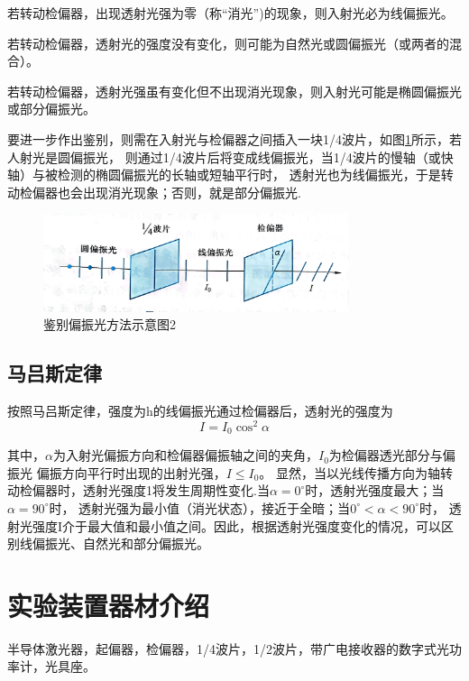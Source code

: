 \documentclass{ctexart}
\begin{document}
  若转动检偏器，出现透射光强为零（称“消光”)的现象，则入射光必为线偏振光。
  
  若转动检偏器，透射光的强度没有变化，则可能为自然光或圆偏振光（或两者的混合）。

  若转动检偏器，透射光强虽有变化但不出现消光现象，则入射光可能是椭圆偏振光或部分偏振光。

  要进一步作出鉴别，则需在入射光与检偏器之间插入一块1/4波片，如图\ref{jinyibujianbie}所示，若人射光是圆偏振光，
  则通过1/4波片后将变成线偏振光，当1/4波片的慢轴（或快轴）与被检测的椭圆偏振光的长轴或短轴平行时，
  透射光也为线偏振光，于是转动检偏器也会出现消光现象；否则，就是部分偏振光.

  \begin{figure}[H]\label{jinyibujianbie}
    \centering
    \includegraphics[width=0.8\textwidth,height=0.35\textheight]{jinyibujianbie.jpg}
    \caption{鉴别偏振光方法示意图2}
  \end{figure}

  \subsection{马吕斯定律}
  按照马吕斯定律，强度为h的线偏振光通过检偏器后，透射光的强度为
  \begin{equation}
    I=I_{0} \cos^{2} \alpha
  \end{equation}

  其中，$\alpha$为入射光偏振方向和检偏器偏振轴之间的夹角，$I_{0}$为检偏器透光部分与偏振光
  偏振方向平行时出现的出射光强，$I \leqslant I_{0}$。
  显然，当以光线传播方向为轴转动检偏器时，透射光强度1将发生周期性变化.当$\alpha = 0^{\circ}$时，透射光强度最大；当$\alpha=90^{\circ}$时，
  透射光强为最小值（消光状态），接近于全暗；当$0^{\circ} < \alpha < 90^{\circ}$时，
  透射光强度I介于最大值和最小值之间。因此，根据透射光强度变化的情况，可以区别线偏振光、自然光和部分偏振光。


\section{实验装置器材介绍}
半导体激光器，起偏器，检偏器，1/4波片，1/2波片，带广电接收器的数字式光功率计，光具座。
\end{document}
